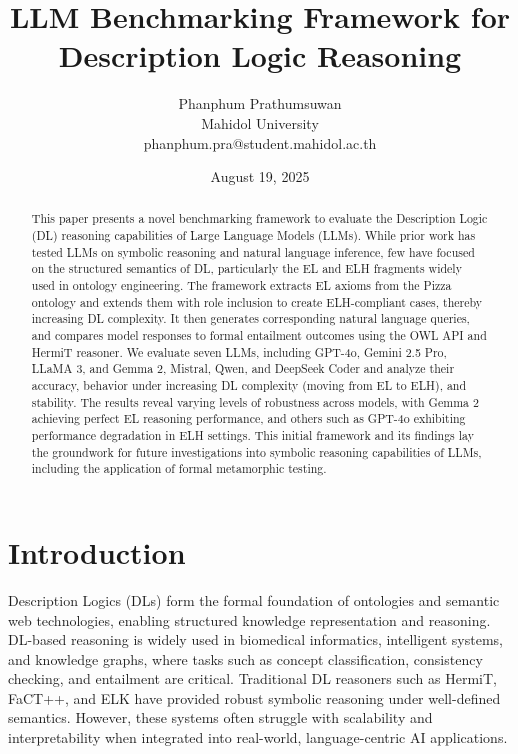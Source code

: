 \documentclass[11pt]{article}
\title{LLM Benchmarking Framework for Description Logic Reasoning}
\author{Phanphum Prathumsuwan\\Mahidol University\\phanphum.pra@student.mahidol.ac.th}
\date{August 19, 2025}
\begin{document}
\maketitle

\begin{abstract}
This paper presents a novel benchmarking framework to evaluate the Description Logic (DL) reasoning capabilities of Large Language Models (LLMs). 
While prior work has tested LLMs on symbolic reasoning and natural language inference\cite{leapofthought2020,han2022folio}, few have focused on the structured semantics of DL, particularly the EL and ELH fragments widely used in ontology engineering\cite{baader2005el}. 
The framework extracts EL axioms from the Pizza ontology\cite{stanford2025pizza, horridge2004pizza} and extends them with role inclusion to create ELH-compliant cases, thereby increasing DL complexity. It then generates corresponding natural language queries, and compares model responses to formal entailment outcomes using the OWL API\cite{owlapi} and HermiT reasoner\cite{hermit2007, glimm2014hermit}. 
We evaluate seven LLMs, including GPT-4o\cite{gpt4o}, Gemini 2.5 Pro\cite{gemini}, LLaMA 3\cite{llama3}, and Gemma 2\cite{gemma3}, Mistral\cite{mistral}, Qwen\cite{qwen7b}, and DeepSeek Coder\cite{deepseekcoder} and analyze their accuracy, behavior under increasing DL complexity (moving from EL to ELH), and stability. The results reveal varying levels of robustness across models, with Gemma 2 achieving perfect EL reasoning performance, 
and others such as GPT-4o exhibiting performance degradation in ELH settings. 
This initial framework and its findings lay the groundwork for future investigations into symbolic reasoning capabilities of LLMs, including the application of formal metamorphic testing\cite{racharak2025test,chen2018metamorphic}.
\end{abstract}

\section{Introduction}
Description Logics (DLs) form the formal foundation of ontologies and semantic web technologies, enabling structured knowledge representation and reasoning\cite{baader2007description}. 
DL-based reasoning is widely used in biomedical informatics\cite{bodenreider2004biomedical}, intelligent systems, and knowledge graphs\cite{ji2022knowledge}, where tasks such as concept classification, consistency checking, and entailment are critical. 
Traditional DL reasoners such as HermiT\cite{glimm2014hermit}, FaCT++\cite{tsarkov2006fact}, and ELK\cite{kazakov2014elk} have provided robust symbolic reasoning under well-defined semantics. 
However, these systems often struggle with scalability and interpretability when integrated into real-world, language-centric AI applications.
\end{document}
